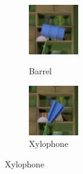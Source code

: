 \documentclass{jov}
\begin{document}
\begin{figure}
\begin{subfigure}[b]{0.14 \textwidth}
        \label{fig:libraryWithSmallBall}
    \end{subfigure}
    ~ 
    \begin{subfigure}[b]{0.14 \textwidth}
        \caption{Barrel}
        \includegraphics[width=\textwidth]{../Figures/Figure4/Figure4_c.png}
        \label{fig:libraryWithBarrel}
    \end{subfigure}
    \begin{subfigure}[b]{0.14 \textwidth}
        \caption{Xylophone}
        \includegraphics[width=\textwidth]{../Figures/Figure4/Figure4_d.png}

\end{subfigure}
\end{figure}
\end{document}
